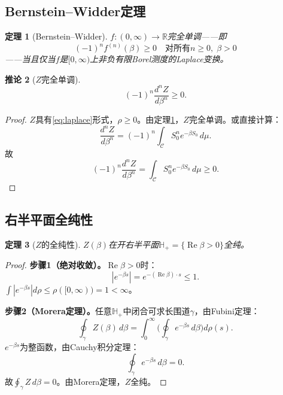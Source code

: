 \documentclass[12pt,a4paper]{article}
\theoremstyle{plain}
\newtheorem{theorem}{定理}[section]
\newtheorem{corollary}[theorem]{推论}
\theoremstyle{definition}
\theoremstyle{remark}
\begin{document}
\subsection{Bernstein--Widder定理}\label{sec:BW}

\begin{theorem}[Bernstein--Widder\cite{Bernstein1929,Widder1941}]\label{thm:BW}
$f:(0,\infty)\to\mathbb{R}$完全单调——即
\begin{equation}\label{eq:cmdef}
(-1)^n f^{(n)}(\beta) \geq 0 \quad\text{对所有}n\geq 0,\;\beta>0
\end{equation}
——当且仅当$f$是$[0,\infty)$上非负有限Borel测度的Laplace变换。
\end{theorem}

\begin{corollary}[$Z$完全单调]\label{cor:cm}
\begin{equation}\label{eq:cm}
(-1)^n\frac{d^nZ}{d\beta^n}\geq 0.
\end{equation}
\end{corollary}

\begin{proof}
$Z$具有\eqref{eq:laplace}形式，$\rho\geq 0$。由定理\ref{thm:BW}，$Z$完全单调。或直接计算：
\begin{equation}\label{eq:cm_direct}
\frac{d^nZ}{d\beta^n} = (-1)^n\int_{\mathcal{C}}S_0^n e^{-\beta S_0}\,d\mu.
\end{equation}
故
\begin{equation}\label{eq:cm_result}
(-1)^n\frac{d^nZ}{d\beta^n} = \int_{\mathcal{C}}S_0^n e^{-\beta S_0}\,d\mu \geq 0.
\end{equation}
\end{proof}

\subsection{右半平面全纯性}\label{sec:holo}

\begin{theorem}[$Z$的全纯性]\label{thm:holo}
$Z(\beta)$在开右半平面$\mathbb{H}_+=\{\operatorname{Re}\beta>0\}$全纯。
\end{theorem}

\begin{proof}
\textbf{步骤1（绝对收敛）。}$\operatorname{Re}\beta>0$时：
\begin{equation}\label{eq:bound}
|e^{-\beta s}| = e^{-(\operatorname{Re}\beta)\cdot s}\leq 1.
\end{equation}
$\int|e^{-\beta s}|d\rho\leq\rho([0,\infty))=1<\infty$。

\textbf{步骤2（Morera定理）。}任意$\mathbb{H}_+$中闭合可求长围道$\gamma$，由Fubini定理：
\begin{equation}\label{eq:morera}
\oint_\gamma Z(\beta)\,d\beta = \int_0^\infty\!\bigg(\oint_\gamma e^{-\beta s}\,d\beta\bigg)d\rho(s).
\end{equation}
$e^{-\beta s}$为整函数，由Cauchy积分定理：
\begin{equation}\label{eq:cauchy_inner}
\oint_\gamma e^{-\beta s}\,d\beta = 0.
\end{equation}
故$\oint_\gamma Z\,d\beta=0$。由Morera定理，$Z$全纯。
\end{proof}
\end{document}
